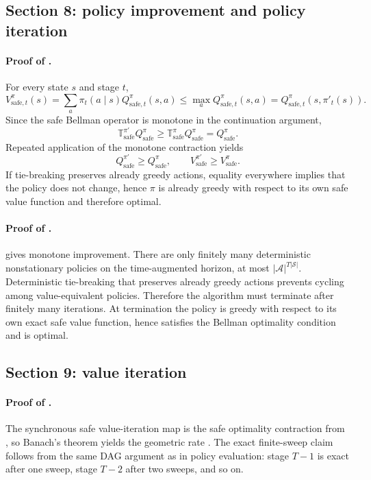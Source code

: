 \documentclass{article}
\theoremstyle{remark}
\newcommand{\cS}{\mathcal{S}}
\newcommand{\cA}{\mathcal{A}}
\newcommand{\safe}{\mathrm{safe}}
\begin{document}
\subsection{Section 8: policy improvement and policy iteration}
\label{app:policy-iter}

\paragraph{Proof of .}
For every state $s$ and stage $t$,
\[
V_{\safe,t}^{\pi}(s)=\sum_a \pi_t(a\mid s)Q_{\safe,t}^{\pi}(s,a)\le \max_a Q_{\safe,t}^{\pi}(s,a)=Q_{\safe,t}^{\pi}(s,\pi'_t(s)).
\]
Since the safe Bellman operator is monotone in the continuation argument,
\[
\mathbb T_\safe^{\pi'}Q_\safe^{\pi}\ge \mathbb T_\safe^{\pi}Q_\safe^{\pi}=Q_\safe^{\pi}.
\]
Repeated application of the monotone contraction yields
\[
Q_\safe^{\pi'}\ge Q_\safe^{\pi},
\qquad
V_\safe^{\pi'}\ge V_\safe^{\pi}.
\]
If tie-breaking preserves already greedy actions, equality everywhere implies that the policy does not change, hence $\pi$ is already greedy with respect to its own safe value function and therefore optimal.

\paragraph{Proof of .}
 gives monotone improvement.
There are only finitely many deterministic nonstationary policies on the time-augmented horizon, at most $|\cA|^{T|\cS|}$.
Deterministic tie-breaking that preserves already greedy actions prevents cycling among value-equivalent policies.
Therefore the algorithm must terminate after finitely many iterations.
At termination the policy is greedy with respect to its own exact safe value function, hence satisfies the Bellman optimality condition and is optimal.

\subsection{Section 9: value iteration}
\label{app:value-iter}

\paragraph{Proof of .}
The synchronous safe value-iteration map is the safe optimality contraction from , so Banach's theorem yields the geometric rate .
The exact finite-sweep claim follows from the same DAG argument as in policy evaluation: stage $T-1$ is exact after one sweep, stage $T-2$ after two sweeps, and so on.
\end{document}
